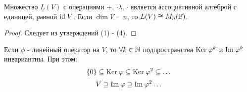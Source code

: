     \begin{theorem}
        Множество $L(V)$ с операциями $+$, $\cdot\lambda $, $\cdot$ является ассоциативной алгеброй с единицей, равной $\id \tab[0.1cm]V$.
        Если $\dim V = n$, то $L(V) \cong M_{n}(\F)$.
    \end{theorem}
    \begin{proof}
        Следует из утверждений (1) - (4).
    \end{proof}
    \begin{subtheorem}
        Если $\phi$ - линейный оператор на $V$, то $\forall k \in \N$ подпространства $\text{Ker} \hspace{0.09cm} \phi^k$ и $\text{Im} \hspace{0.09cm} \phi^k$ инвариантны. При этом: 
        $$\{0\} \subseteq \text{Ker} \hspace{0.09cm} \phi \subseteq \text{Ker} \hspace{0.09cm} \phi^2 \subseteq \ldots$$
        $$V \supseteq \text{Im} \hspace{0.09cm} \phi \supseteq \text{Im} \hspace{0.09cm} \phi^2\ldots$$
    \end{subtheorem}

    
     

